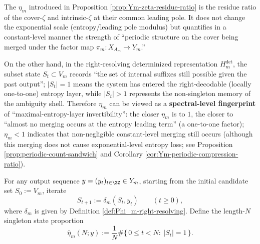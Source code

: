 \begin{remark}\label{rem:eta_m_as_reversibility_certificate}
The \(\eta_m\) introduced in Proposition \ref{prop:Ym-zeta-residue-ratio} is the residue ratio of the cover-\(\zeta\) and intrinsic-\(\zeta\) at their common leading pole.
It does not change the exponential scale (entropy/leading pole modulus) but quantifies in a constant-level manner the strength of ``periodic structure on the cover being merged under the factor map \(\pi_m:X_{A_m}\to Y_m\).''
\par
On the other hand, in the right-resolving determinized representation \(H_m^{\mathrm{det}}\), the subset state \(S_t\subset V_m\) records ``the set of internal suffixes still possible given the past output'';
\(|S_t|=1\) means the system has entered the right-decodable (locally one-to-one) entropy layer, while \(|S_t|>1\) represents the non-singleton memory of the ambiguity shell.
Therefore \(\eta_m\) can be viewed as a \textbf{spectral-level fingerprint} of ``maximal-entropy-layer invertibility'': the closer \(\eta_m\) is to \(1\), the closer to ``almost no merging occurs at the entropy leading term'' (a one-to-one factor);
\(\eta_m<1\) indicates that non-negligible constant-level merging still occurs (although this merging does not cause exponential-level entropy loss; see Proposition \ref{prop:periodic-count-sandwich} and Corollary \ref{cor:Ym-periodic-compression-ratio}).
\end{remark}

\begin{definition}\label{def:eta_m_hat_singleton_rate}
For any output sequence \(y=(y_t)_{t\in\ZZ}\in Y_m\), starting from the initial candidate set \(S_0:=V_m\), iterate
\[
S_{t+1}:=\delta_m(S_t,y_t)\qquad (t\ge 0),
\]
where \(\delta_m\) is given by Definition \ref{def:Phi_m-right-resolving}.
Define the length-\(N\) singleton state proportion
\[
\widehat\eta_m(N;y):=\frac{1}{N}\#\{\,0\le t<N:\ |S_t|=1\,\}.
\]
\end{definition}

